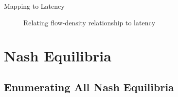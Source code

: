 \documentclass[xcolor=svgnames, english, smaller]{beamer}
\theoremstyle{plain}
\theoremstyle{definition}
\theoremstyle{plain}
\theoremstyle{plain}
\begin{document}
\begin{frame}{Mapping to Latency}
\begin{figure}
{}

\begin{centering}
\caption{Relating flow-density relationship to latency}

\par\end{centering}

\end{figure}



\end{frame}


\section{Nash Equilibria}

\subsection{Enumerating All Nash Equilibria}
\end{document}
